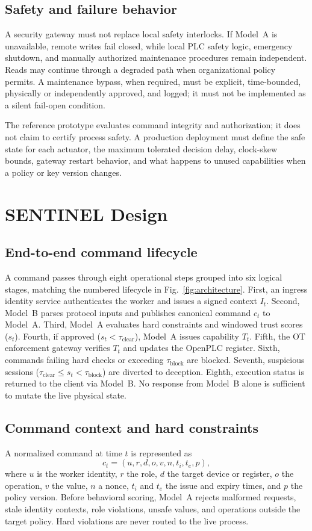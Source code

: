 \documentclass[journal]{IEEEtran}
\begin{document}
\subsection{Safety and failure behavior}
A security gateway must not replace local safety interlocks. If Model~A is unavailable, remote writes fail closed, while local PLC safety logic, emergency shutdown, and manually authorized maintenance procedures remain independent. Reads may continue through a degraded path when organizational policy permits. A maintenance bypass, when required, must be explicit, time-bounded, physically or independently approved, and logged; it must not be implemented as a silent fail-open condition.

The reference prototype evaluates command integrity and authorization; it does not claim to certify process safety. A production deployment must define the safe state for each actuator, the maximum tolerated decision delay, clock-skew bounds, gateway restart behavior, and what happens to unused capabilities when a policy or key version changes.

\section{SENTINEL Design}
\subsection{End-to-end command lifecycle}
A command passes through eight operational steps grouped into six logical stages, matching the numbered lifecycle in Fig.~\ref{fig:architecture}. First, an ingress identity service authenticates the worker and issues a signed context $I_t$. Second, Model~B parses protocol inputs and publishes canonical command $c_t$ to Model~A. Third, Model~A evaluates hard constraints and windowed trust scores ($s_t$). Fourth, if approved ($s_t < \tau_{\mathrm{clear}}$), Model~A issues capability $T_t$. Fifth, the OT enforcement gateway verifies $T_t$ and updates the OpenPLC register. Sixth, commands failing hard checks or exceeding $\tau_{\mathrm{block}}$ are blocked. Seventh, suspicious sessions ($\tau_{\mathrm{clear}} \le s_t < \tau_{\mathrm{block}}$) are diverted to deception. Eighth, execution status is returned to the client via Model~B. No response from Model~B alone is sufficient to mutate the live physical state.

\subsection{Command context and hard constraints}
A normalized command at time $t$ is represented as
\begin{equation}
 c_t = (u, r, d, o, v, n, t_i, t_e, p),
\end{equation}
where $u$ is the worker identity, $r$ the role, $d$ the target device or register, $o$ the operation, $v$ the value, $n$ a nonce, $t_i$ and $t_e$ the issue and expiry times, and $p$ the policy version. Before behavioral scoring, Model~A rejects malformed requests, stale identity contexts, role violations, unsafe values, and operations outside the target policy. Hard violations are never routed to the live process.
\end{document}
